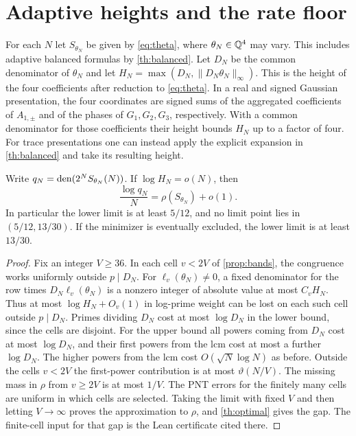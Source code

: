 \documentclass[11pt]{article}
\begin{document}
\section{Adaptive heights and the rate floor}\label{sec:adaptive}

For each $N$ let $S_{\theta_N}$ be given by \eqref{eq:theta}, where
$\theta_N\in\mathbb Q^4$ may vary. This includes adaptive balanced formulas by \cref{th:balanced}. Let $D_N$ be the common denominator of $\theta_N$ and let $H_N=\max(D_N,\|D_N\theta_N\|_\infty)$. This is the height of the four coefficients after reduction to \eqref{eq:theta}. In a real and signed Gaussian presentation, the four coordinates are signed sums of the aggregated coefficients of $A_{1,\pm}$ and of the phases of $G_1,G_2,G_3$, respectively. With a common denominator for those coefficients their height bounds $H_N$ up to a factor of four. For trace presentations one can instead apply the explicit expansion in \cref{th:balanced} and take its resulting height.

\begin{theorem}\label{th:adaptive}
Write $q_N=\operatorname{den}(2^NS_{\theta_N}(N))$. If $\log H_N=o(N)$, then
\[
 \frac{\log q_N}{N}=\rho(S_{\theta_N})+o(1).
\]
In particular the lower limit is at least $5/12$, and no limit point lies in $(5/12,13/30)$. If the minimizer is eventually excluded, the lower limit is at least $13/30$.
\end{theorem}
\begin{proof}
Fix an integer $V\ge36$. In each cell $v<2V$ of \cref{prop:bands}, the congruence works uniformly outside $p\mid D_N$. For $\ell_v(\theta_N)\ne0$, a fixed denominator for the row times $D_N\ell_v(\theta_N)$ is a nonzero integer of absolute value at most $C_v H_N$. Thus at most $\log H_N+O_v(1)$ in log-prime weight can be lost on each such cell outside $p\mid D_N$. Primes dividing $D_N$ cost at most $\log D_N$ in the lower bound, since the cells are disjoint. For the upper bound all powers coming from $D_N$ cost at most $\log D_N$, and their first powers from the lcm cost at most a further $\log D_N$. The higher powers from the lcm cost $O(\sqrt N\log N)$ as before. Outside the cells $v<2V$ the first-power contribution is at most $\vartheta(N/V)$. The missing mass in $\rho$ from $v\ge2V$ is at most $1/V$. The PNT errors for the finitely many cells are uniform in which cells are selected. Taking the limit with fixed $V$ and then letting $V\to\infty$ proves the approximation to $\rho$, and \cref{th:optimal} gives the gap. The finite-cell input for that gap is the Lean certificate cited there.
\end{proof}
\end{document}
